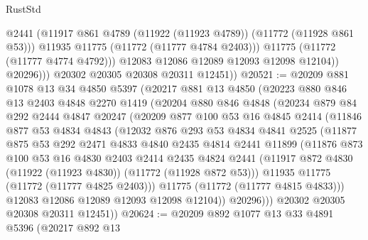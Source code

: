 \begin{lexlean}{RustStd}
\begin{coremodule}
                      @2441
                      (@11917 @861 @4789 (@11922 (@11923 @4789)) (@11772 (@11928 @861 @53)))
                      @11935
                      @11775
                      (@11772 (@11777 @4784 @2403)))
                    @11775
                    (@11772 (@11777 @4774 @4792)))
                  @12083
                  @12086
                  @12089
                  @12093
                  @12098
                  @12104))
              @20296)))
        @20302
        @20305
        @20308
        @20311
        @12451))
@20521 := @20209
    @881
    @1078
    @13
    @34
    @4850
    @5397
    (@20217
      @881
      @13
      @4850
      (@20223
        @880
        @846
        @13
        @2403
        @4848
        @2270
        @1419
        (@20204
          @880
          @846
          @4848
          (@20234
            @879
            @84
            @292
            @2444
            @4847
            @20247
            (@20209
              @877
              @100
              @53
              @16
              @4845
              @2414
              (@11846
                @877
                @53
                @4834
                @4843
                (@12032
                  @876
                  @293
                  @53
                  @4834
                  @4841
                  @2525
                  (@11877
                    @875
                    @53
                    @292
                    @2471
                    @4833
                    @4840
                    @2435
                    @4814
                    @2441
                    @11899
                    (@11876
                      @873
                      @100
                      @53
                      @16
                      @4830
                      @2403
                      @2414
                      @2435
                      @4824
                      @2441
                      (@11917 @872 @4830 (@11922 (@11923 @4830)) (@11772 (@11928 @872 @53)))
                      @11935
                      @11775
                      (@11772 (@11777 @4825 @2403)))
                    @11775
                    (@11772 (@11777 @4815 @4833)))
                  @12083
                  @12086
                  @12089
                  @12093
                  @12098
                  @12104))
              @20296)))
        @20302
        @20305
        @20308
        @20311
        @12451))
@20624 := @20209
    @892
    @1077
    @13
    @33
    @4891
    @5396
    (@20217
      @892
      @13

\end{coremodule}
\end{lexlean}
